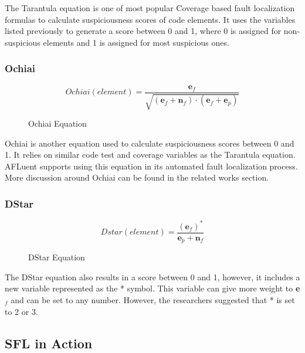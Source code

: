 The Tarantula equation is one of most popular Coverage based fault localization
formulas to calculate suspiciousness scores of code elements. It uses the
variables listed previously to generate a score between 0 and 1, where 0 is
assigned for non-suspicious elements and 1 is assigned for most suspicious ones.

\subsubsection{Ochiai}
\label{subsubsec:Ochiai}
\begin{figure}[!htb]
	\begin{center}
		\begin{equation}
			Ochiai(element) = \frac{\textbf{e$_{f}$}}{\sqrt{(\textbf{e$_{f}$}  + \textbf{n$_{f}$}) \cdot (\textbf{e$_{f}$}  + \textbf{e$_{p}$})}}
		\end{equation}
		\caption{\label{fig:ochiaiEquation} Ochiai Equation\cite{Abreu2006Ochiai}}
	\end{center}
\end{figure}

Ochiai is another equation used to calculate suspiciousness scores between 0 and
1. It relies on similar code test and coverage variables as the Tarantula
equation. AFLuent supports using this equation in its automated fault
localization process. More discussion around Ochiai can be found in the related
works section.

\subsubsection{DStar}
\label{subsubsec:DStar}
\begin{figure}[!htb]
	\begin{center}
		\begin{equation}
			Dstar(element) = \frac{(\textbf{e$_{f}$})^{\ast}}{\textbf{e$_{p}$} + \textbf{n$_{f}$}}
		\end{equation}
		\caption{\label{fig:dstarEquation} DStar Equation\cite{Wong2014DStar}}
	\end{center}
\end{figure}

The DStar equation also results in a score between 0 and 1, however, it includes
a new variable represented as the * symbol. This variable can give more
weight to \textbf{e$_{f}$} and can be set to any number. However, the
researchers suggested that * is set to 2 or 3.

\subsection{SFL in Action}
\label{subsec:SFLinAction}

